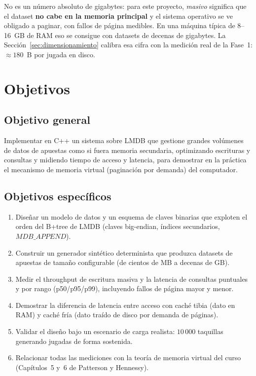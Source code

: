 \documentclass[12pt, letterpaper]{article}
\begin{document}
No es un número absoluto de gigabytes: para este proyecto, \emph{masivo}
significa que el dataset \textbf{no cabe en la memoria principal} y el sistema
operativo se ve obligado a paginar, con fallos de página medibles. En una
máquina típica de 8--16~GB de RAM eso se consigue con datasets de decenas de
gigabytes. La Sección~\ref{sec:dimensionamiento} calibra esa cifra con la
medición real de la Fase~1: $\approx 180$~B por jugada en disco.

\section{Objetivos}

\subsection{Objetivo general}

Implementar en C++ un sistema sobre LMDB que gestione grandes volúmenes de
datos de apuestas como si fuera memoria secundaria, optimizando escrituras y
consultas y midiendo tiempo de acceso y latencia, para demostrar en la
práctica el mecanismo de memoria virtual (paginación por demanda) del
computador.

\subsection{Objetivos específicos}

\begin{enumerate}
    \item Diseñar un modelo de datos y un esquema de claves binarias que
    exploten el orden del B+tree de LMDB (claves big-endian, índices
    secundarios, $MDB\_APPEND$).
    \item Construir un generador sintético determinista que produzca
    datasets de apuestas de tamaño configurable (de cientos de MB a decenas
    de GB).
    \item Medir el throughput de escritura masiva y la latencia de
    consultas puntuales y por rango (p50/p95/p99), incluyendo fallos de
    página mayor y menor.
    \item Demostrar la diferencia de latencia entre acceso con caché tibia
    (dato en RAM) y caché fría (dato traído de disco por demanda de páginas).
    \item Validar el diseño bajo un escenario de carga realista: $10\,000$
    taquillas generando jugadas de forma sostenida.
    \item Relacionar todas las mediciones con la teoría de memoria virtual
    del curso (Capítulos~5 y~6 de Patterson y Hennessy).
\end{enumerate}
\end{document}
